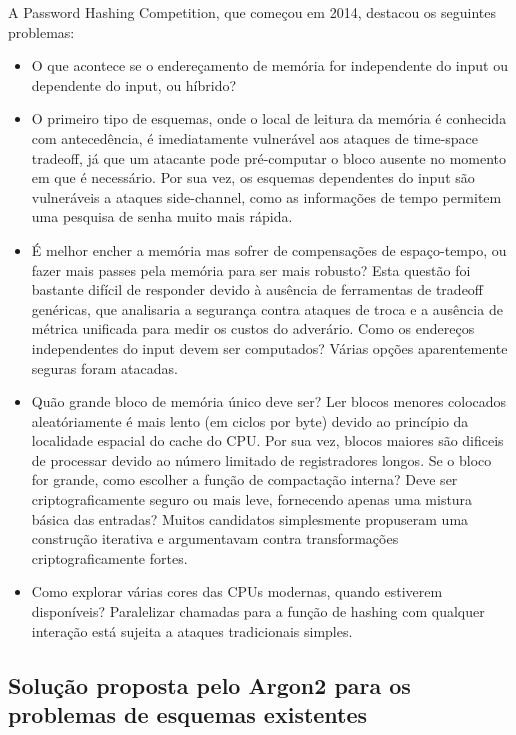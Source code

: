 \documentclass[conference]{IEEEtran}
\begin{document}
A Password Hashing Competition, que começou em 2014, destacou os seguintes problemas: 
\begin{itemize}
\item O que acontece se o endereçamento de memória for independente do input ou 
dependente do input, ou híbrido? 
\item O primeiro tipo de esquemas, onde o local de leitura da memória é conhecida 
com antecedência, é imediatamente vulnerável aos ataques de time-space tradeoff, 
já que um atacante pode pré-computar o bloco ausente no momento em que é necessário. 
Por sua vez, os esquemas dependentes do input são vulneráveis a ataques side-channel, 
como as informações de tempo permitem uma pesquisa de senha muito mais rápida. 
\item É melhor encher a memória mas sofrer de compensações de espaço-tempo, ou fazer 
mais passes pela memória para ser mais robusto? Esta questão foi bastante difícil 
de responder devido à ausência de ferramentas de tradeoff genéricas, 
que analisaria a segurança contra ataques de troca e a ausência de métrica 
unificada para medir os custos do adverário. Como os endereços independentes do 
input devem ser computados? Várias opções aparentemente seguras foram atacadas.
\item Quão grande bloco de memória único deve ser? Ler blocos menores colocados 
aleatóriamente é mais lento (em ciclos por byte) devido ao princípio da 
localidade espacial do cache do CPU. Por sua vez, blocos maiores são dificeis 
de processar devido ao número limitado de registradores longos. Se o bloco 
for grande, como escolher a função de compactação interna? Deve ser criptograficamente 
seguro ou mais leve, fornecendo apenas uma mistura básica das entradas? 
Muitos candidatos simplesmente propuseram uma construção iterativa e argumentavam 
contra transformações criptograficamente fortes. 
\item Como explorar várias cores das CPUs modernas, quando estiverem disponíveis? 
Paralelizar chamadas para a função de hashing com qualquer interação está sujeita 
a ataques tradicionais simples.
\end{itemize} \cite{argon2spec}

\subsection{Solução proposta pelo Argon2 para os problemas de esquemas existentes}
\end{document}
